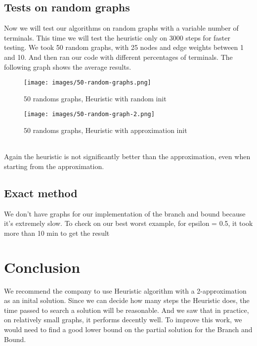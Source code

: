 \documentclass{article}
\begin{document}
\subsection{Tests on random graphs}

Now we will test our algorithms on random graphs with a variable number of terminals. This time we will test the heuristic only on 3000 steps for faster testing. We took 50 random graphs, with 25 nodes and edge weights between 1 and 10. And then ran our code with different percentages of terminals. The following graph shows the average results.
\begin{figure}[h!]
    \centering
    \texttt{[image: images/50-random-graphs.png]}
    \caption{50 randoms graphs, Heuristic with random init}
    \label{fig:enter-label}
\end{figure}
\begin{figure}[h!]
    \centering
    \texttt{[image: images/50-random-graph-2.png]}
    \caption{50 randoms graphs, Heuristic with approximation init}
    \label{fig:enter-label}
\end{figure}\\
Again the heuristic is not significantly better than the approximation, even when starting from the approximation.
\newpage
\subsection{Exact method}

We don't have graphs for our implementation of the branch and bound because it's extremely slow. To check on our best worst example, for epsilon = 0.5, it took more than 10 min to get the result
\newpage
\section{Conclusion}

We recommend the company to use Heuristic algorithm with a 2-approximation as an inital solution. Since we can decide how many steps the Heuristic does, the time passed to search a solution will be reasonable. And we saw that in practice, on relatively small graphs, it performs decently well.
To improve this work, we would need to find a good lower bound on the partial solution for the Branch and Bound.
\newpage
\end{document}

